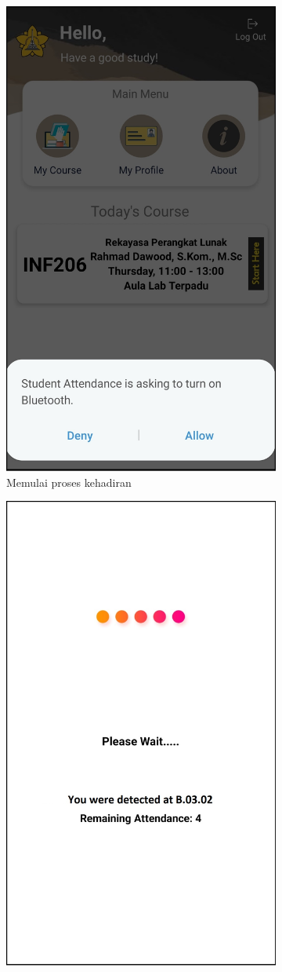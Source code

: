 \begin{enumerate}[a.]
\begin{figure} [H]
\begin{subfigure}{.5\textwidth}
			      \includegraphics[width=.5\linewidth]{gambar/android/mahasiswa-6}
			      \caption{Memulai proses kehadiran}
		      \end{subfigure}
		      \vspace{1cm}
		      \newline
		      \begin{subfigure}{.5\textwidth}
			      \centering
			      \includegraphics[width=.5\linewidth]{gambar/android/mahasiswa-7}

\end{subfigure}
\end{figure}
\end{enumerate}
